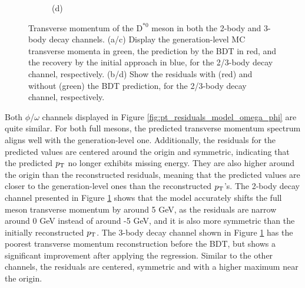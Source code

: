 \begin{figure}[!ht]
\begin{subfigure}[t]{0.50\mylength}
        \vspace*{-0.2cm}
        \caption{\footnotesize (d)}
    \end{subfigure}%
\caption{Transverse momentum of the $\text{D}^{*0}$ meson in both the 2-body and 3-body decay channels. (a/c) Display the generation-level MC transverse momenta in green, the prediction by the BDT in red, and the recovery by the initial approach in blue, for the 2/3-body decay channel, respectively. (b/d) Show the residuals with (red) and without (green) the BDT prediction, for the 2/3-body decay channel, respectively.}
\label{fig:pt_residuals_model_d0star}
    \vspace*{-0.0cm}
\end{figure}

Both $\phi$/$\omega$ channels displayed in Figure \ref{fig:pt_residuals_model_omega_phi} are quite similar. For both full mesons, the predicted transverse momentum spectrum aligns well with the generation-level one. Additionally, the residuals for the predicted values are centered around the origin and symmetric, indicating that the predicted $p_\text{T}$ no longer exhibits missing energy. They are also higher around the origin than the reconstructed residuals, meaning that the predicted values are closer to the generation-level ones than the reconstructed $p_\text{T}$'s. The 2-body decay channel presented in Figure \ref{fig:pt_residuals_model_d0star} shows that the model accurately shifts the full meson transverse momentum by around 5 GeV, as the residuals are narrow around 0 GeV instead of around -5 GeV, and it is also more symmetric than the initially reconstructed $p_\text{T}$. The 3-body decay channel shown in Figure \ref{fig:pt_residuals_model_d0star} has the poorest transverse momentum reconstruction before the BDT, but shows a significant improvement after applying the regression. Similar to the other channels, the residuals are centered, symmetric and with a higher maximum near the origin.

